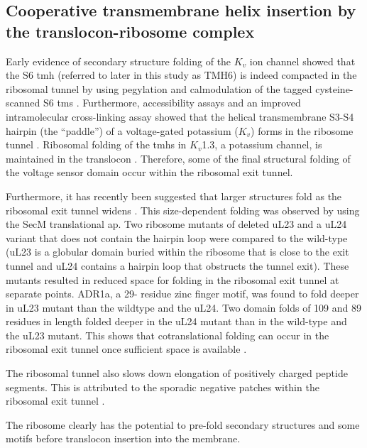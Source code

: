 \subsection{Cooperative transmembrane helix insertion by the translocon-ribosome complex}

Early evidence of secondary structure folding of the $K_{v}$ ion channel showed that the S6 \gls{tmh} (referred to later in this study as TMH6) is indeed compacted in the ribosomal tunnel by using pegylation and calmodulation of the tagged cysteine-scanned S6 \gls{tms} \cite{Lu2005}.
Furthermore, accessibility assays and an improved intramolecular  cross\--linking assay showed that the helical transmembrane S3\--S4 hairpin (the “paddle”) of a voltage-gated potassium ($K_{v}$) forms in the ribosome tunnel \cite{Tu2014}.
Ribosomal folding of the \gls{tmh}s in $K_{v}$1.3, a potassium channel, is maintained in the translocon \cite{Tu2010a}.
Therefore, some of the final structural folding of the voltage sensor domain occur within the ribosomal exit tunnel.

Furthermore, it has recently been suggested that larger structures fold as the ribosomal exit tunnel widens \cite{Kudva2018}.
This size\--dependent folding was observed by using the SecM translational \gls{ap}.
Two ribosome mutants of deleted uL23 and a uL24 variant that does not contain the hairpin loop were compared to the wild\--type (uL23 is a globular domain buried within the ribosome that is close to the exit tunnel and uL24 contains a hairpin loop that obstructs the tunnel exit).
These mutants resulted in reduced space for folding in the ribosomal exit tunnel at separate points.
ADR1a, a 29\-- residue zinc finger motif, was found to fold deeper in uL23 mutant than the wildtype and the uL24.
Two domain folds of 109 and 89 residues in length folded deeper in the uL24 mutant than in the wild\--type and the uL23 mutant.
This shows that cotranslational folding can occur in the ribosomal exit tunnel once sufficient space is available \cite{Kudva2018}.

The ribosomal tunnel also slows down elongation of positively charged peptide segments.
This is attributed to the sporadic negative patches within the ribosomal exit tunnel \cite{Lu2008}.

The ribosome clearly has the potential to pre\--fold secondary structures and some motifs before translocon insertion into the membrane.

